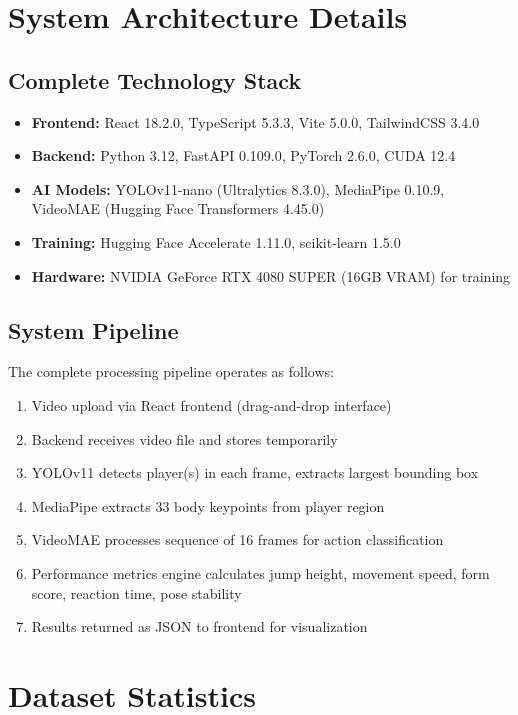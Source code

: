 \section{System Architecture Details}
\label{app:architecture}

\subsection{Complete Technology Stack}
\begin{itemize}
    \item \textbf{Frontend:} React 18.2.0, TypeScript 5.3.3, Vite 5.0.0, TailwindCSS 3.4.0
    \item \textbf{Backend:} Python 3.12, FastAPI 0.109.0, PyTorch 2.6.0, CUDA 12.4
    \item \textbf{AI Models:} YOLOv11-nano (Ultralytics 8.3.0), MediaPipe 0.10.9, VideoMAE (Hugging Face Transformers 4.45.0)
    \item \textbf{Training:} Hugging Face Accelerate 1.11.0, scikit-learn 1.5.0
    \item \textbf{Hardware:} NVIDIA GeForce RTX 4080 SUPER (16GB VRAM) for training
\end{itemize}

\subsection{System Pipeline}
The complete processing pipeline operates as follows:
\begin{enumerate}
    \item Video upload via React frontend (drag-and-drop interface)
    \item Backend receives video file and stores temporarily
    \item YOLOv11 detects player(s) in each frame, extracts largest bounding box
    \item MediaPipe extracts 33 body keypoints from player region
    \item VideoMAE processes sequence of 16 frames for action classification
    \item Performance metrics engine calculates jump height, movement speed, form score, reaction time, pose stability
    \item Results returned as JSON to frontend for visualization
\end{enumerate}

\section{Dataset Statistics}
\label{app:dataset}


